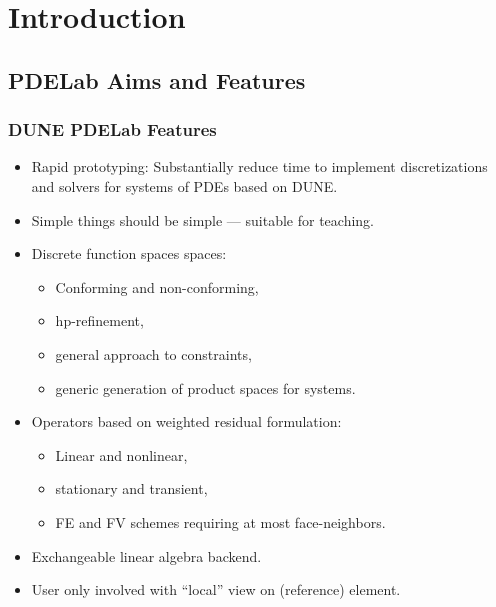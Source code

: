 \section{Introduction}

\subsection{PDELab Aims and Features}

\begin{frame}
\frametitle<presentation>{DUNE PDELab Features}
\begin{itemize}
\item Rapid prototyping: Substantially reduce time to implement
discretizations and solvers for systems of PDEs based on DUNE.
\item Simple things should be simple --- suitable for teaching.
\item Discrete function spaces spaces:
\begin{itemize}
\item Conforming and non-conforming,
\item hp-refinement,
\item general approach to constraints,
\item generic generation of product spaces for systems.
\end{itemize} 
\item Operators based on weighted residual formulation:
\begin{itemize}
\item Linear and nonlinear,
\item stationary and transient,
\item FE and FV schemes requiring at most face-neighbors.
\end{itemize} 
\item Exchangeable linear algebra backend. 
\item User only involved with ``local'' view on (reference) element.
\end{itemize}
\end{frame}


